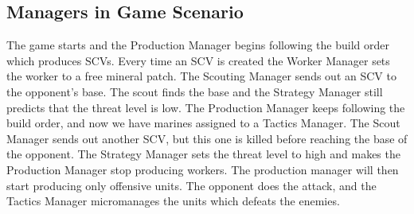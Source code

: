 	\subsection{Managers in Game Scenario}
		The game starts and the Production Manager begins following the build order which produces SCVs. Every time an SCV is created the 
		Worker Manager sets the worker to a free mineral patch. The Scouting Manager sends out an SCV to the opponent's base. The scout 
		finds the base and the Strategy Manager still predicts that the threat level is low. The Production Manager keeps following the build order, and now 
		we have marines assigned to a Tactics Manager. The Scout Manager sends out another SCV, but this one is killed before reaching the base of the 
		opponent. The Strategy Manager sets the threat level to high and makes the Production Manager stop producing workers. The production manager will then start producing only offensive units. 
		The opponent does the attack, and the Tactics Manager micromanages the units which defeats the enemies.

